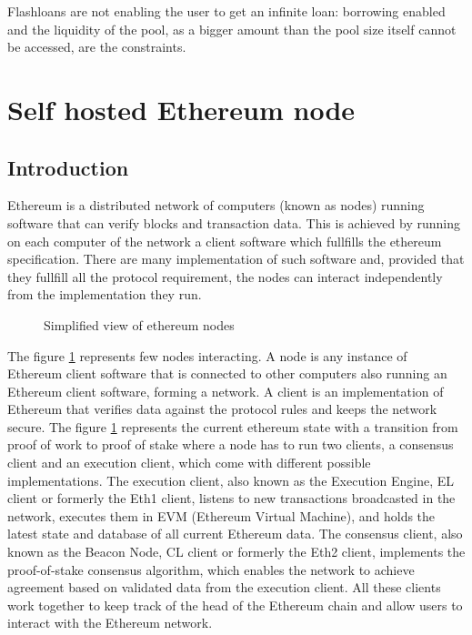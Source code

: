 \documentclass[11pt,a4paper,titlepage]{scrartcl}
\begin{document}
Flashloans  are not enabling the user to get an infinite loan: borrowing enabled and the liquidity of the pool, as a bigger amount than the pool size  itself cannot be accessed, are the constraints.


\newpage

\section{Self hosted Ethereum node}
\subsection {Introduction}
Ethereum is a distributed network of computers (known as nodes) running software that can verify blocks and transaction data. This is achieved by running on each computer of the network a client software which fullfills the ethereum specification. There are many implementation of such software and, provided that they fullfill all the protocol requirement, the nodes can interact independently from the  implementation they run. 
\begin{figure}[ht]
    \caption{Simplified view of ethereum nodes}
    \label{fig:ethnodes}
\end{figure}

The figure \ref{fig:ethnodes} represents few nodes interacting. A node is any instance of Ethereum client software that is connected to other computers also running an Ethereum client software, forming a network. A client is an implementation of Ethereum that verifies data against the protocol rules and keeps the network secure. The figure \ref{fig:ethnodes} represents the current ethereum  state with a transition  from proof of work to proof of stake where a node has to run two clients, a consensus client and an execution client,  which come with different possible implementations. The execution client, also known as the Execution Engine, EL client or formerly the Eth1 client, listens to new transactions broadcasted in the network, executes them in EVM (Ethereum Virtual Machine), and holds the latest state and database of all current Ethereum data. The consensus client, also known as the Beacon Node, CL client or formerly the Eth2 client, implements the proof-of-stake consensus algorithm, which enables the network to achieve agreement based on validated data from the execution client. All these clients work together to keep track of the head of the Ethereum chain and allow users to interact with the Ethereum network. 
\end{document}
